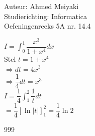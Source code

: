 \documentclass[a4paper]{article}
\begin{document}
  
\noindent \large Auteur: Ahmed Meiyaki \\
\noindent \large Studierichting: Informatica\\
\noindent \large Oefeningenreeks 5A nr. 14.4\\

\medskip


\normalsize

$I = \displaystyle\int_{0}^{1} \dfrac{x^3}{1+x^4} dx  $\\

Stel $t = 1 + x^4 $\\

$\Rightarrow dt = 4x^3 $\\

$\Rightarrow \dfrac{1}{4}dt = x^3 $\\

$I = \dfrac{1}{4}\displaystyle\int_{1}^{2} \dfrac{1}{t} dt  $\\

$= \dfrac{1}{4} \left[\ln|t|\right]_{1}^{2} = \dfrac{1}{4} \ln2$\\





\begin{thebibliography}{999}
\end{thebibliography}
\end{document}
